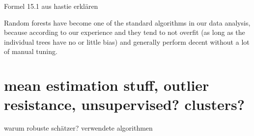 Formel 15.1 aus hastie erklären

Random forests have become one of the standard algorithms
in our data analysis, because according to our
experience and \cite{hastie2017springer} they tend to
not overfit (as long as the individual trees have no or little bias)
and generally perform decent without a lot of manual tuning.


\section{mean estimation stuff, outlier resistance, unsupervised? clusters?}
warum robuste schätzer?
verwendete algorithmen
